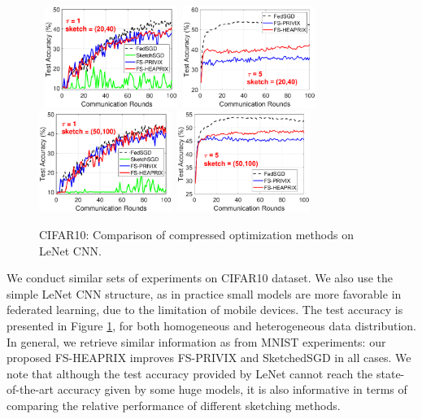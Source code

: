 \documentclass[twoside]{article}
\begin{document}
\begin{figure}[H]
\begin{center}
{	
		\mbox{\hspace{-0.15in}	
		\includegraphics[width=1.7in]{CIFAR_figures/cifar_local1_sketch20_iid0_test_acc.eps}  \hspace{-0.12in}
		\includegraphics[width=1.7in]{CIFAR_figures/cifar_local5_sketch20_iid0_test_acc.eps}
		\includegraphics[width=1.7in]{CIFAR_figures/cifar_local1_sketch50_iid0_test_acc.eps}\hspace{-0.12in}
		\includegraphics[width=1.7in]{CIFAR_figures/cifar_local5_sketch50_iid0_test_acc.eps}
		}
		}
	\end{center}
	\vspace{-0.1in}
	\caption{CIFAR10: Comparison of compressed optimization methods on LeNet CNN.}
    \label{fig:CIFAR}
\end{figure}

We conduct similar sets of experiments on CIFAR10 dataset. We also use the simple LeNet CNN structure, as in practice small models are more favorable in federated learning, due to the limitation of mobile devices. The test accuracy is presented in Figure \ref{fig:CIFAR}, for both homogeneous and heterogeneous data distribution. In general, we retrieve similar information as from MNIST experiments: our proposed FS-HEAPRIX improves FS-PRIVIX and SketchedSGD in all cases. We note that although the test accuracy provided by LeNet cannot reach the state-of-the-art accuracy given by some huge models, it is also informative in terms of comparing the relative performance of different sketching methods.
\end{document}
